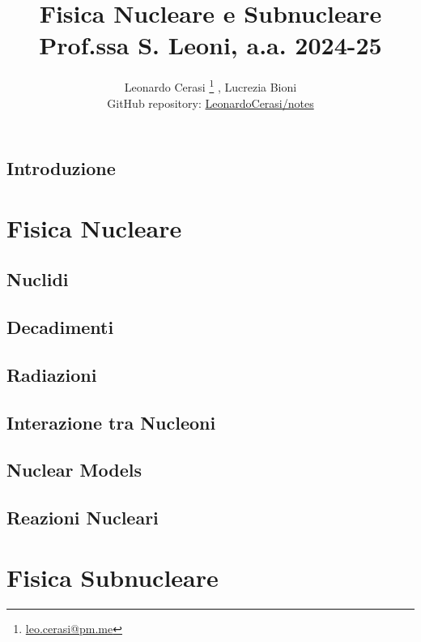 \documentclass[a4paper, 12pt, openany]{book}
\author{Leonardo Cerasi%
	\thanks{\scriptsize\href{mailto:leonardo.cerasi@studenti.unimi.it}{leo.cerasi@pm.me}}%
	, Lucrezia Bioni\\
	\small GitHub repository: \href{https://github.com/LeonardoCerasi/notes}{LeonardoCerasi/notes}}
\title{\Huge\textbf{Fisica Nucleare e Subnucleare} \\ \large Prof.ssa S. Leoni, a.a. 2024-25}
\begin{document}
\frontmatter

\maketitle

\tableofcontents
\pagestyle{indice}

\mainmatter

\chapter*{Introduzione}
\pagestyle{introd}


\part{Fisica Nucleare}
\pagestyle{body}

\chapter{Nuclidi}
\pagestyle{body}


\chapter{Decadimenti}
\pagestyle{body}


\chapter{Radiazioni}
\pagestyle{body}


\chapter{Interazione tra Nucleoni}
\pagestyle{body}


\chapter{Nuclear Models}
\pagestyle{body}


\chapter{Reazioni Nucleari}
\pagestyle{body}


\part{Fisica Subnucleare}
\pagestyle{body}
\end{document}
